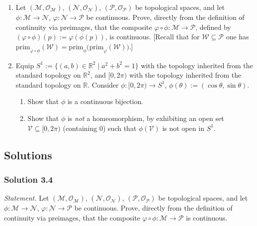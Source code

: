 \documentclass[11pt]{article}
\newcommand{\prim}[1]{\mathrm{prim}_{#1}}
\begin{document}
\begin{enumerate}[label=\textbf{3.\arabic*}, leftmargin=2.2cm, start=4]

\item \label{prob:continuity-composition}
Let $(\mathcal M,\mathcal O_{\mathcal M})$, $(\mathcal N,\mathcal O_{\mathcal N})$, $(\mathcal P,\mathcal O_{\mathcal P})$ be topological spaces, and let $\phi:\mathcal M\to\mathcal N$, $\varphi:\mathcal N\to\mathcal P$ be continuous. Prove, directly from the definition of continuity via preimages, that the composite $\varphi\circ\phi:\mathcal M\to\mathcal P$, defined by $(\varphi\circ\phi)(p):=\varphi(\phi(p))$, is continuous. [Recall that for $\mathcal W\subseteq\mathcal P$ one has $\prim{\varphi\circ\phi}(\mathcal W)=\prim{\phi}\big(\prim{\varphi}(\mathcal W)\big)$.]

\item \label{prob:not-homeomorphism}
Equip $S^1:=\{(a,b)\in\mathbb R^2\mid a^2+b^2=1\}$ with the topology inherited from the standard topology on $\mathbb R^2$, and $[0,2\pi)$ with the topology inherited from the standard topology on $\mathbb R$. Consider $\phi:[0,2\pi)\to S^1$, $\phi(\theta):=(\cos\theta,\sin\theta)$.
\begin{enumerate}[label=(\alph*)]
  \item Show that $\phi$ is a continuous bijection.
  \item Show that $\phi$ is \emph{not} a homeomorphism, by exhibiting an open set $\mathcal V\subseteq[0,2\pi)$ (containing $0$) such that $\phi(\mathcal V)$ is not open in $S^1$.
\end{enumerate}

\end{enumerate}

\subsection*{Solutions}

\subsubsection*{Solution 3.4}

\noindent\textit{Statement.} Let $(\mathcal M,\mathcal O_{\mathcal M})$, $(\mathcal N,\mathcal O_{\mathcal N})$, $(\mathcal P,\mathcal O_{\mathcal P})$ be topological spaces, and let $\phi:\mathcal M\to\mathcal N$, $\varphi:\mathcal N\to\mathcal P$ be continuous. Prove, directly from the definition of continuity via preimages, that the composite $\varphi\circ\phi:\mathcal M\to\mathcal P$ is continuous.
\end{document}

